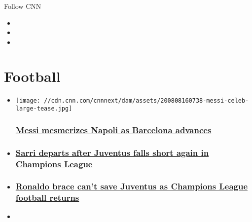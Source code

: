 Follow CNN

\begin{itemize}
\item
\item
\item
\end{itemize}

\hypertarget{football}{%
\section{Football}\label{football}}

\begin{itemize}
\item
  \href{/2020/08/08/football/football-champions-league-barcelona-messi-bayern-munich/index.html}{}

  \texttt{[image: //cdn.cnn.com/cnnnext/dam/assets/200808160738-messi-celeb-large-tease.jpg]}

  \hypertarget{messi-mesmerizes-napoli-as-barcelona-advances}{%
  \subsubsection{\texorpdfstring{\href{/2020/08/08/football/football-champions-league-barcelona-messi-bayern-munich/index.html}{Messi
  mesmerizes Napoli as Barcelona
  advances}}{Messi mesmerizes Napoli as Barcelona advances}}\label{messi-mesmerizes-napoli-as-barcelona-advances}}
\item
  \hypertarget{sarri-departs-after-juventus-falls-short-again-in-champions-league}{%
  \subsubsection{\texorpdfstring{\href{/2020/08/08/football/football-juventus-sack-sarri-ronaldo-spt-intl/index.html}{Sarri
  departs after Juventus falls short again in Champions
  League}}{Sarri departs after Juventus falls short again in Champions League}}\label{sarri-departs-after-juventus-falls-short-again-in-champions-league}}
\item
  \hypertarget{ronaldo-brace-cant-save-juventus-as-champions-league-football-returns}{%
  \subsubsection{\texorpdfstring{\href{/2020/08/07/football/juventus-manchester-city-real-madrid-champions-league-spt-intl/index.html}{Ronaldo
  brace can't save Juventus as Champions League football
  returns}}{Ronaldo brace can't save Juventus as Champions League football returns}}\label{ronaldo-brace-cant-save-juventus-as-champions-league-football-returns}}
\item
  \hypertarget{more-than-a-club-how-barcelona-lost-its-soul}{%
}
\end{itemize}
